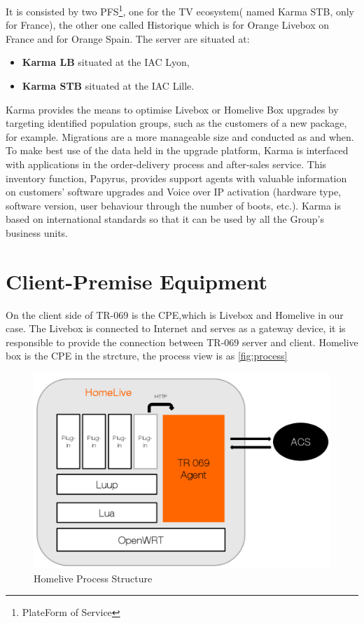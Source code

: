 It is consisted by two PFS\footnote{PlateForm of Service}, one for the TV ecosystem( named Karma STB, only for France), the other one called Historique which is for Orange Livebox on France and for Orange Spain. The server are situated at:
\begin{itemize}
	\item \textbf{Karma LB} situated at the IAC Lyon,
	\item \textbf{Karma STB} situated at the IAC Lille.
\end{itemize}

Karma provides the means to optimise Livebox or Homelive Box upgrades by targeting identified population groups, such as the customers of a new package, for example. Migrations are a more manageable size and conducted as and when. To make best use of the data held in the upgrade platform, Karma is interfaced with applications in the order-delivery process and after-sales service. This inventory function, Papyrus, provides support agents with valuable information on customers’ software upgrades and Voice over IP activation (hardware type, software version, user behaviour through the number of boots, etc.). Karma is based on international standards so that it can be used by all the Group’s business units.

\section{Client-Premise Equipment}
On the client side of TR-069 is the CPE,which is Livebox and Homelive in our case. The Livebox is connected to Internet and serves as a gateway device, it is responsible to provide the connection between TR-069 server and client. Homelive box is the CPE in the strcture, the process view is as \autoref{fig:process}

\begin{figure}[htbp]
	\centering
		\includegraphics[width=12cm]{Figures/process.png}
	\caption[Homelive Process Structure]{Homelive Process Structure}
	\label{fig:process}
\end{figure}

